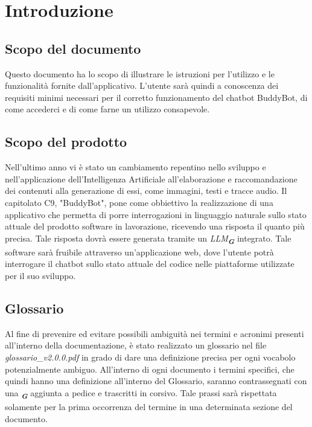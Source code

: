

\section{Introduzione}
\label{sec:introduzione}

\subsection{Scopo del documento}
Questo documento ha lo scopo di illustrare le istruzioni per l’utilizzo e le funzionalità fornite
dall’applicativo. L’utente sarà quindi a conoscenza dei requisiti minimi necessari per il
corretto funzionamento del chatbot BuddyBot, di come accederci e di come farne un utilizzo
consapevole.

\subsection{Scopo del prodotto}
Nell’ultimo anno vi è stato un cambiamento repentino nello sviluppo e nell’applicazione
dell’Intelligenza Artificiale all’elaborazione e raccomandazione dei contenuti alla generazione
di essi, come immagini, testi e tracce audio.
Il capitolato C9, "BuddyBot", pone come obbiettivo la realizzazione di una applicativo che permetta di porre interrogazioni in
linguaggio naturale sullo stato attuale del prodotto software in lavorazione, ricevendo una risposta il quanto più precisa. Tale
risposta dovrà essere generata tramite un \emph{LLM}\textsubscript{\textbf{\textit{G}}} integrato. Tale software sarà fruibile
attraverso un'applicazione web, dove l'utente potrà interrogare il chatbot sullo stato attuale del codice nelle piattaforme
utilizzate per il suo sviluppo.

\subsection{Glossario}
Al fine di prevenire ed evitare possibili ambiguità nei termini e acronimi presenti all’interno della documentazione, è stato
realizzato un glossario nel file \emph{glossario\_v2.0.0.pdf} in grado di dare una definizione precisa per ogni vocabolo potenzialmente
ambiguo. All’interno di ogni documento i termini specifici, che quindi hanno una definizione all’interno del Glossario, saranno
contrassegnati con una \textsubscript{\textbf{\textit{G}}} aggiunta a pedice e trascritti in corsivo. Tale prassi sarà rispettata
solamente per la prima occorrenza del termine in una determinata sezione del documento.
